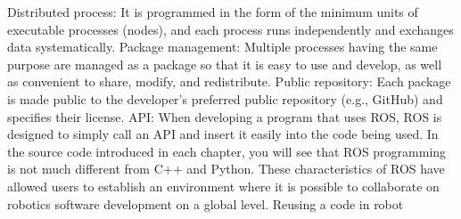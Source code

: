 Distributed process: It is programmed in the form of the minimum units of executable processes (nodes), and each process runs independently and exchanges data systematically. Package management: Multiple processes having the same purpose are managed as a package so that it is easy to use and develop, as well as convenient to share, modify, and redistribute. Public repository: Each package is made public to the developer’s preferred public repository (e.g., GitHub) and specifies their license. API: When developing a program that uses ROS, ROS is designed to simply call an API and insert it easily into the code being used. In the source code introduced in each chapter, you will see that ROS programming is not much different from C++ and Python. These characteristics of ROS have allowed users to establish an environment where it is possible to collaborate on robotics software development on a global level. Reusing a code in robot 



